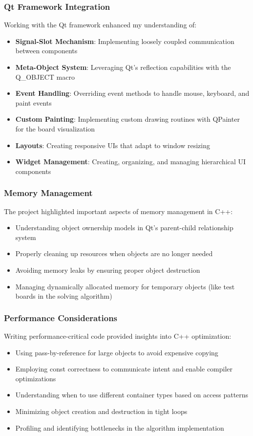 \subsubsection{Qt Framework Integration}
Working with the Qt framework enhanced my understanding of:

\begin{itemize}
    \item \textbf{Signal-Slot Mechanism}: Implementing loosely coupled communication between components
    \item \textbf{Meta-Object System}: Leveraging Qt's reflection capabilities with the Q\_OBJECT macro
    \item \textbf{Event Handling}: Overriding event methods to handle mouse, keyboard, and paint events
    \item \textbf{Custom Painting}: Implementing custom drawing routines with QPainter for the board visualization
    \item \textbf{Layouts}: Creating responsive UIs that adapt to window resizing
    \item \textbf{Widget Management}: Creating, organizing, and managing hierarchical UI components
\end{itemize}

\subsubsection{Memory Management}
The project highlighted important aspects of memory management in C++:

\begin{itemize}
    \item Understanding object ownership models in Qt's parent-child relationship system
    \item Properly cleaning up resources when objects are no longer needed
    \item Avoiding memory leaks by ensuring proper object destruction
    \item Managing dynamically allocated memory for temporary objects (like test boards in the solving algorithm)
\end{itemize}

\subsubsection{Performance Considerations}
Writing performance-critical code provided insights into C++ optimization:

\begin{itemize}
    \item Using pass-by-reference for large objects to avoid expensive copying
    \item Employing const correctness to communicate intent and enable compiler optimizations
    \item Understanding when to use different container types based on access patterns
    \item Minimizing object creation and destruction in tight loops
    \item Profiling and identifying bottlenecks in the algorithm implementation
\end{itemize}